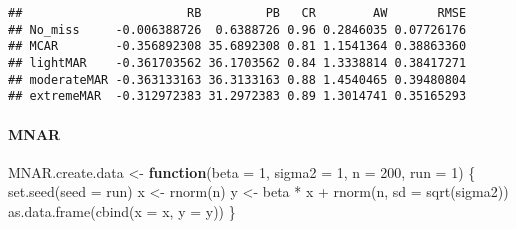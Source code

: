 \documentclass[
]{article}
\newenvironment{Shaded}{\begin{snugshade}}{\end{snugshade}}
\newcommand{\AttributeTok}[1]{\textcolor[rgb]{0.77,0.63,0.00}{#1}}
\newcommand{\ControlFlowTok}[1]{\textcolor[rgb]{0.13,0.29,0.53}{\textbf{#1}}}
\newcommand{\DecValTok}[1]{\textcolor[rgb]{0.00,0.00,0.81}{#1}}
\newcommand{\FunctionTok}[1]{\textcolor[rgb]{0.00,0.00,0.00}{#1}}
\newcommand{\NormalTok}[1]{#1}
\newcommand{\OtherTok}[1]{\textcolor[rgb]{0.56,0.35,0.01}{#1}}
\newcommand{\SpecialCharTok}[1]{\textcolor[rgb]{0.00,0.00,0.00}{#1}}
\begin{document}
\begin{verbatim}
##                       RB         PB   CR        AW       RMSE
## No_miss     -0.006388726  0.6388726 0.96 0.2846035 0.07726176
## MCAR        -0.356892308 35.6892308 0.81 1.1541364 0.38863360
## lightMAR    -0.361703562 36.1703562 0.84 1.3338814 0.38417271
## moderateMAR -0.363133163 36.3133163 0.88 1.4540465 0.39480804
## extremeMAR  -0.312972383 31.2972383 0.89 1.3014741 0.35165293
\end{verbatim}

\hypertarget{mnar}{%
\paragraph{MNAR}\label{mnar}}

\begin{Shaded}
\begin{Highlighting}[]
\NormalTok{MNAR.create.data }\OtherTok{\textless{}{-}} \ControlFlowTok{function}\NormalTok{(}\AttributeTok{beta =} \DecValTok{1}\NormalTok{, }\AttributeTok{sigma2 =} \DecValTok{1}\NormalTok{, }\AttributeTok{n =} \DecValTok{200}\NormalTok{,}
                        \AttributeTok{run =} \DecValTok{1}\NormalTok{) \{}
  \FunctionTok{set.seed}\NormalTok{(}\AttributeTok{seed =}\NormalTok{ run)}
\NormalTok{  x }\OtherTok{\textless{}{-}} \FunctionTok{rnorm}\NormalTok{(n)}
\NormalTok{  y }\OtherTok{\textless{}{-}}\NormalTok{ beta }\SpecialCharTok{*}\NormalTok{ x }\SpecialCharTok{+} \FunctionTok{rnorm}\NormalTok{(n, }\AttributeTok{sd =} \FunctionTok{sqrt}\NormalTok{(sigma2))}
  \FunctionTok{as.data.frame}\NormalTok{(}\FunctionTok{cbind}\NormalTok{(}\AttributeTok{x =}\NormalTok{ x, }\AttributeTok{y =}\NormalTok{ y))}
\NormalTok{\}}
\end{Highlighting}
\end{Shaded}
\end{document}

